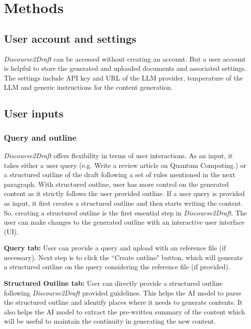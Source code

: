 \documentclass[utf8]{FrontiersinHarvard} %
\newcommand{\appname}{\emph{Discourse2Draft}}
\begin{document}
\section{Methods}

\subsection{User account and settings}
\appname{} can be accessed without creating an account. But a user account is helpful to store the generated and uploaded documents and associated settings. The settings include API key and URL of the LLM provider, temperature of the LLM and generic instructions for the content generation.

\subsection{User inputs}

\subsubsection{Query and outline}
\appname{} offers flexibility in terms of user interactions. As an input, it takes either a user query (e.g. Write a review article on Quantum Computing.) or a structured outline of the draft following a set of rules mentioned in the next paragraph. With structured outline, user has more control on the generated content as it strictly follows the user provided outline. If a user query is provided as input, it first creates a structured outline and then starts writing the content. So, creating a structured outline is the first essential step in \appname{}. The user can make changes to the generated outline with an interactive user interface (UI). 

\textbf{Query tab:} User can provide a query and upload with an reference file (if necessary). Next step is to click the ``Create outline" button, which will generate a structured outline on the query considering the reference file (if provided). 

\textbf{Structured Outline tab:} User can directly provide a structured outline following \appname{} provided guidelines. This helps the AI model to parse the structured outline and identify places where it needs to generate contents. It also helps the AI model to extract the pre-written summary of the content which will be useful to maintain the continuity in generating the new content. 
\end{document}
